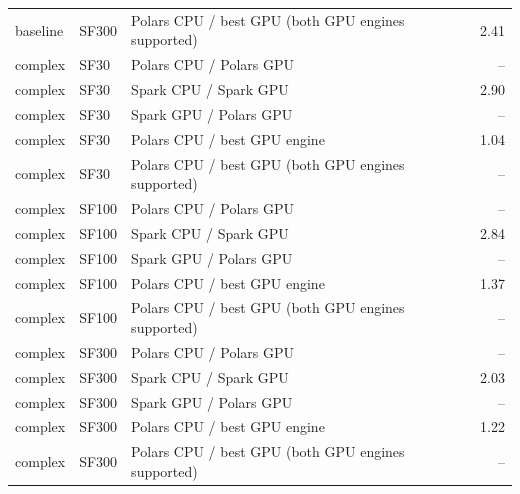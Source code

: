 \begin{tabular}{lllr}
baseline & SF300 & Polars CPU / best GPU (both GPU engines supported) & 2.41 \\
complex & SF30 & Polars CPU / Polars GPU & -- \\
complex & SF30 & Spark CPU / Spark GPU & 2.90 \\
complex & SF30 & Spark GPU / Polars GPU & -- \\
complex & SF30 & Polars CPU / best GPU engine & 1.04 \\
complex & SF30 & Polars CPU / best GPU (both GPU engines supported) & -- \\
complex & SF100 & Polars CPU / Polars GPU & -- \\
complex & SF100 & Spark CPU / Spark GPU & 2.84 \\
complex & SF100 & Spark GPU / Polars GPU & -- \\
complex & SF100 & Polars CPU / best GPU engine & 1.37 \\
complex & SF100 & Polars CPU / best GPU (both GPU engines supported) & -- \\
complex & SF300 & Polars CPU / Polars GPU & -- \\
complex & SF300 & Spark CPU / Spark GPU & 2.03 \\
complex & SF300 & Spark GPU / Polars GPU & -- \\
complex & SF300 & Polars CPU / best GPU engine & 1.22 \\
complex & SF300 & Polars CPU / best GPU (both GPU engines supported) & -- \\
\bottomrule
\end{tabular}
